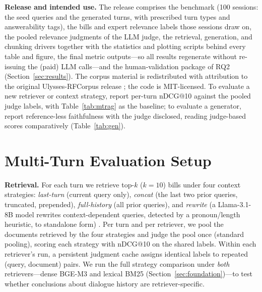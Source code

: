 \documentclass[conference]{IEEEtran}
\begin{document}
\textbf{Release and intended use.} The release comprises the benchmark (100
sessions: the seed queries and the generated turns, with prescribed turn types
and answerability tags), the bills and expert relevance labels those sessions
draw on, the pooled relevance judgments of the LLM judge, the retrieval,
generation, and chunking drivers together with the statistics and plotting
scripts behind every table and figure, the final metric outputs---so all
results regenerate without re-issuing the (paid) LLM calls---and the
human-validation package of RQ2 (Section~\ref{sec:results}). The corpus
material is redistributed with attribution to the original Ulysses-RFCorpus
release \cite{Vitorio2024}; the code is MIT-licensed. To evaluate a new
retriever or context strategy, report per-turn
nDCG@10 against the pooled judge labels, with Table~\ref{tab:mtrag} as the
baseline; to evaluate a generator, report reference-less faithfulness with the
judge disclosed, reading judge-based scores comparatively
(Table~\ref{tab:gen}).



\section{Multi-Turn Evaluation Setup}
\label{sec:setup}
\textbf{Retrieval.} For each turn we retrieve top-$k$ ($k{=}10$) bills under four
context strategies: \emph{last-turn} (current query only), \emph{concat} (the
last two prior queries, truncated, prepended), \emph{full-history} (all prior
queries), and \emph{rewrite} (a Llama-3.1-8B model rewrites context-dependent
queries, detected by a pronoun/length heuristic, to standalone form)
\cite{Mao2023LLM4CS,Elgohary2019CANARD}. Per turn and per retriever, we pool the
documents retrieved by the four strategies and judge the pool once (standard
pooling), scoring each strategy with nDCG@10 on the shared labels. Within each retriever's run, a persistent judgment cache assigns identical
labels to repeated (query, document) pairs. We run the full strategy comparison under \emph{both}
retrievers---dense BGE-M3 and lexical BM25 (Section~\ref{sec:foundation})---to test
whether conclusions about dialogue history are retriever-specific.
\end{document}
